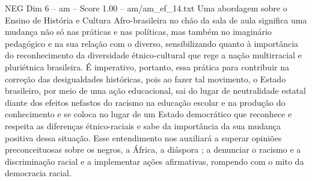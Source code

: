 \begin{textsample}{NEG Dim 6 – am – Score 1.00 – am/am\_ef\_14.txt}
Uma abordagem sobre o Ensino de História e Cultura Afro-brasileira no chão da sala de aula significa uma mudança não só nas práticas e nas políticas, mas também no imaginário pedagógico e na sua relação com o diverso, sensibilizando quanto à importância do reconhecimento da diversidade étnico-cultural que rege a nação multirracial e pluriétnica brasileira.
É imperativo, portanto, essa prática para contribuir na correção das desigualdades históricas, pois ao fazer tal movimento, o Estado brasileiro, por meio de uma ação educacional, sai do lugar de neutralidade estatal diante dos efeitos nefastos do racismo na educação escolar e na produção do conhecimento e se coloca no lugar de um Estado democrático que reconhece e respeita as diferenças étnico-raciais e sabe da importância da sua mudança positiva dessa situação.
Esse entendimento nos auxiliará a superar opiniões preconceituosas sobre os negros, a África, a diáspora ; a denunciar o racismo e a discriminação racial e a implementar ações afirmativas, rompendo com o mito da democracia racial.

\end{textsample}
